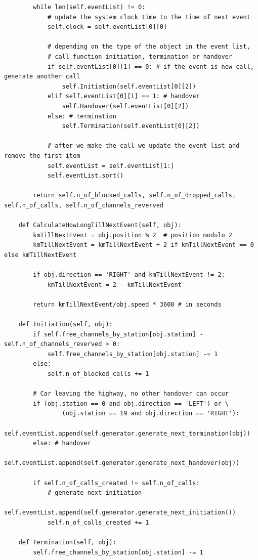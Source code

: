 \documentclass[12pt,a4paper]{article}
\begin{document}
\begin{lstlisting}
        while len(self.eventList) != 0:
            # update the system clock time to the time of next event
            self.clock = self.eventList[0][0]

            # depending on the type of the object in the event list,
            # call function initiation, termination or handover
            if self.eventList[0][1] == 0: # if the event is new call, generate another call
                self.Initiation(self.eventList[0][2])
            elif self.eventList[0][1] == 1: # handover
                self.Handover(self.eventList[0][2])
            else: # termination
                self.Termination(self.eventList[0][2])

            # after we make the call we update the event list and remove the first item
            self.eventList = self.eventList[1:]
            self.eventList.sort()

        return self.n_of_blocked_calls, self.n_of_dropped_calls, self.n_of_calls, self.n_of_channels_reverved

    def CalculateHowLongTillNextEvent(self, obj):
        kmTillNextEvent = obj.position % 2  # position modulo 2
        kmTillNextEvent = kmTillNextEvent + 2 if kmTillNextEvent == 0 else kmTillNextEvent

        if obj.direction == 'RIGHT' and kmTillNextEvent != 2:
            kmTillNextEvent = 2 - kmTillNextEvent

        return kmTillNextEvent/obj.speed * 3600 # in seconds

    def Initiation(self, obj):
        if self.free_channels_by_station[obj.station] - self.n_of_channels_reverved > 0:
            self.free_channels_by_station[obj.station] -= 1
        else:
            self.n_of_blocked_calls += 1

        # Car leaving the highway, no other handover can occur
        if (obj.station == 0 and obj.direction == 'LEFT') or \
                (obj.station == 19 and obj.direction == 'RIGHT'):
            self.eventList.append(self.generator.generate_next_termination(obj))
        else: # handover
            self.eventList.append(self.generator.generate_next_handover(obj))

        if self.n_of_calls_created != self.n_of_calls:
            # generate next initiation
            self.eventList.append(self.generator.generate_next_initiation())
            self.n_of_calls_created += 1

    def Termination(self, obj):
        self.free_channels_by_station[obj.station] -= 1


\end{lstlisting}
\end{document}
